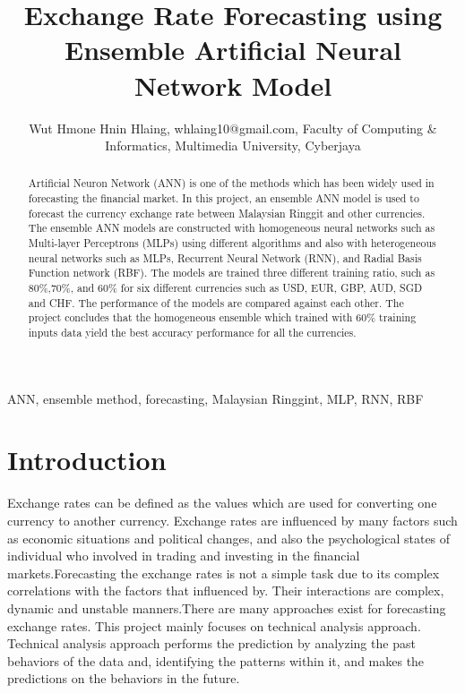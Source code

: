 \documentclass[journal]{IEEEtran}
\begin{document}
\title{Exchange Rate Forecasting using Ensemble Artificial Neural Network Model }

\author{Wut Hmone Hnin Hlaing, whlaing10@gmail.com, Faculty of Computing \& Informatics, Multimedia University, Cyberjaya}
\maketitle

\begin{abstract}
Artificial Neuron Network (ANN) is one of the methods which has been widely used in forecasting the financial market.  In this project, an ensemble ANN model is used to forecast the currency exchange rate between Malaysian Ringgit and other currencies. The ensemble ANN models are constructed with homogeneous neural networks such as Multi-layer Perceptrons (MLPs) using different algorithms and also with heterogeneous neural networks such as MLPs, Recurrent Neural Network (RNN), and Radial Basis  Function network (RBF). The models are trained three different training ratio, such as 80\%,70\%, and 60\% for six different currencies such as USD, EUR, GBP, AUD, SGD and CHF. The performance of the models are compared against each other. The project concludes that the homogeneous ensemble which trained with 60\% training inputs data yield the best accuracy performance for all the currencies.
\end{abstract}

\begin{IEEEkeywords}
 ANN, ensemble method, forecasting, Malaysian Ringgint, MLP, RNN, RBF 
\end{IEEEkeywords}


\IEEEpeerreviewmaketitle

\section{Introduction}
Exchange rates can be defined as the values which are used for  converting one currency to another currency. Exchange rates are influenced by many factors such as economic situations and political changes, and also the psychological states of individual  who involved in trading and investing in the financial markets.Forecasting the exchange rates is not a simple task due to its complex correlations with the factors that influenced by. Their interactions are complex, dynamic and  unstable  manners.There are many approaches exist for forecasting exchange rates.  This project mainly focuses on technical  analysis approach. Technical analysis approach performs the prediction by analyzing the past behaviors of the data and, identifying the patterns within it, and makes the predictions on the  behaviors  in the future.
\end{document}
